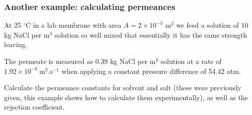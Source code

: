\begin{frame}\frametitle{Another example: calculating permeances}
	At 25 $^\circ$C in a lab membrane with area $A = 2 \times 10^{-3}$ $\text{m}^{2}$ we feed a solution of 10 kg NaCl per m$^3$ solution so well mixed that essentially it has the same strength leaving.

	\vspace{12pt}
	The permeate is measured as 0.39 kg NaCl per $\text{m}^{3}$ solution at a rate of $1.92 \times 10^{-8}~\text{m}^3\text{.s}^{-1}$ when applying a constant pressure difference of 54.42 atm.

	\vspace{12pt}
	Calculate the permeance constants for solvent and salt (these were previously given, this example shows how to calculate them experimentally), as well as the rejection coefficient.
\end{frame}

